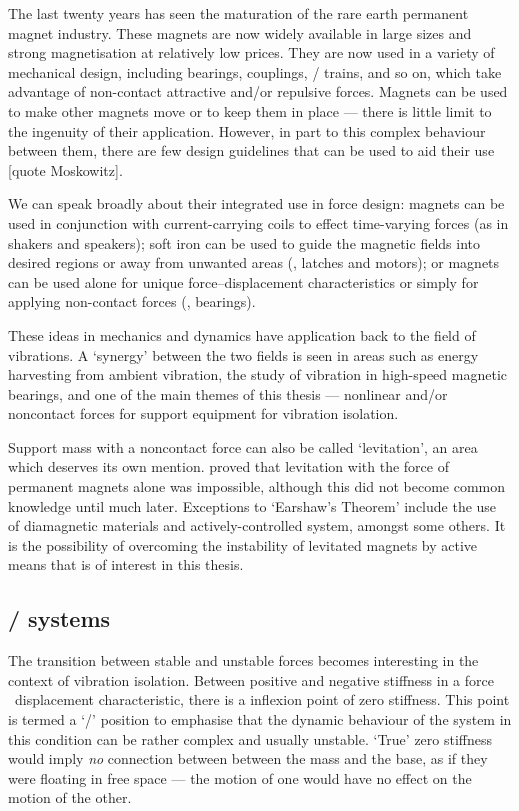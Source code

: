 The last twenty years has seen the maturation of the rare earth permanent magnet industry.
These magnets are now widely available in large sizes and strong magnetisation at relatively low prices.
They are now used in a variety of mechanical design, including bearings, couplings, \maglev/ trains, and so on, which take advantage of non-contact attractive and/or repulsive forces.
Magnets can be used to make other magnets move or to keep them in place — there is little limit to the ingenuity of their application.
However, in part to this complex behaviour between them, there are few design guidelines that can be used to aid their use [quote Moskowitz].

We can speak broadly about their integrated use in force design: magnets can be used in conjunction with current-carrying coils to effect time-varying forces (as in shakers and speakers); soft iron can be used to guide the magnetic fields into desired regions or away from unwanted areas (\eg, latches and motors); or magnets can be used alone for unique force--displacement characteristics or simply for applying non-contact forces (\eg, bearings).

These ideas in mechanics and dynamics have application back to the field of vibrations.
A `synergy' between the two fields is seen in areas such as energy harvesting from ambient vibration, the study of vibration in high-speed magnetic bearings, and one of the main themes of this thesis — nonlinear and/or noncontact forces for support equipment for vibration isolation.

Support mass with a noncontact force can also be called `levitation', an area which deserves its own mention.
\textcite{earnshaw1842} proved that levitation with the force of permanent magnets alone was impossible, although this did not become common knowledge  until much later.
Exceptions to `Earshaw's Theorem' include the use of diamagnetic materials and actively-controlled system, amongst some others.
It is the possibility of overcoming the instability of levitated magnets by active means that is of interest in this thesis.


\subsection{\QZS/ systems}

The transition between stable and unstable forces becomes interesting in the context of vibration isolation.
Between positive and negative stiffness in a force \vs\ displacement characteristic, there is a inflexion point of zero stiffness.
This point is termed a `\qzs/' position to emphasise that the dynamic behaviour of the system in this condition can be rather complex and usually unstable.
`True' zero stiffness would imply \emph{no} connection between between the mass and the base, as if they were floating in free space — the motion of one would have no effect on the motion of the other.

